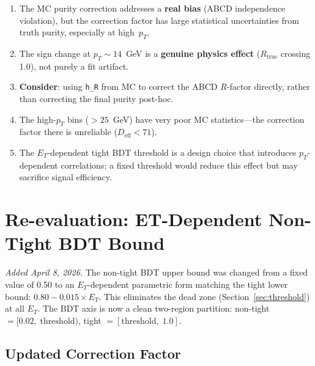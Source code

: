 \documentclass[11pt,a4paper]{article}
\begin{document}
\begin{enumerate}
\item The MC purity correction addresses a \textbf{real bias} (ABCD independence
      violation), but the correction factor has large statistical uncertainties
      from truth purity, especially at high~$p_T$.
\item The sign change at $p_T \sim 14$~GeV is a \textbf{genuine physics effect}
      ($R_{\mathrm{true}}$ crossing 1.0), not purely a fit artifact.
\item \textbf{Consider}: using \texttt{h\_R} from MC to correct the ABCD $R$-factor
      directly, rather than correcting the final purity post-hoc.
\item The high-$p_T$ bins ($> 25$~GeV) have very poor MC statistics---the
      correction factor there is unreliable ($D_{\mathrm{eff}} < 71$).
\item The $E_T$-dependent tight BDT threshold is a design choice that introduces
      $p_T$-dependent correlations; a fixed threshold would reduce this effect
      but may sacrifice signal efficiency.
\end{enumerate}

\section{Re-evaluation: ET-Dependent Non-Tight BDT Bound}
\label{sec:etdep}

\textit{Added April 8, 2026.} The non-tight BDT upper bound was changed from
a fixed value of 0.50 to an $E_T$-dependent parametric form matching the
tight lower bound: $0.80 - 0.015 \times E_T$. This eliminates the dead zone
(Section~\ref{sec:threshold}) at all $E_T$. The BDT axis is now a clean
two-region partition: non-tight $= [0.02,\;\mathrm{threshold})$,
tight $= [\mathrm{threshold},\;1.0]$.

\subsection{Updated Correction Factor}
\end{document}
